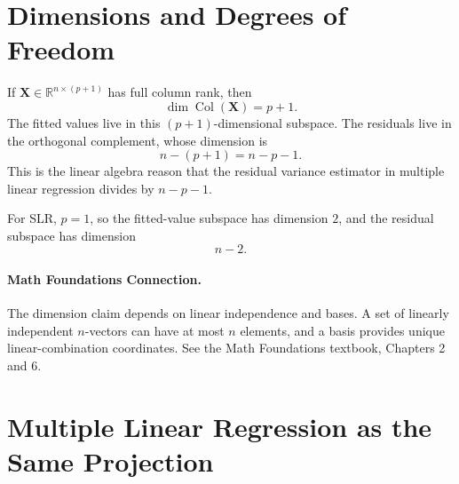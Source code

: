 \section{Dimensions and Degrees of Freedom}

If \(\mathbf{X}\in\mathbb{R}^{n\times(p+1)}\) has full column rank, then
\begin{equation}
  \dim\operatorname{Col}(\mathbf{X})=p+1.
\end{equation}
The fitted values live in this \((p+1)\)-dimensional subspace.  The residuals live in the orthogonal complement, whose dimension is
\begin{equation}
  n-(p+1)=n-p-1.
\end{equation}
This is the linear algebra reason that the residual variance estimator in multiple linear regression divides by \(n-p-1\).

For SLR, \(p=1\), so the fitted-value subspace has dimension \(2\), and the residual subspace has dimension
\begin{equation}
  n-2.
\end{equation}

\paragraph{Math Foundations Connection.}
The dimension claim depends on linear independence and bases.  A set of linearly independent \(n\)-vectors can have at most \(n\) elements, and a basis provides unique linear-combination coordinates.  See the Math Foundations textbook, Chapters 2 and 6.

\section{Multiple Linear Regression as the Same Projection}

